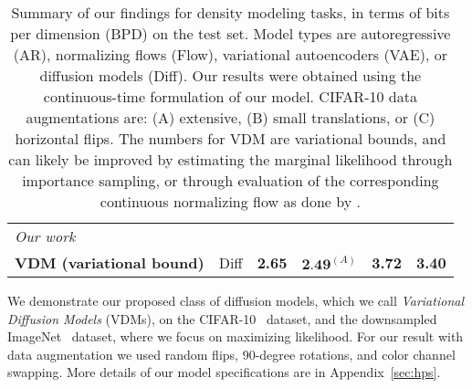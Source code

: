\documentclass{article}
\begin{document}
\begin{table}[t]
\begin{center}
\begin{tabular}{lccccc}
\midrule
\textit{Our work}\\
\textbf{VDM (variational bound)} & Diff & \textbf{2.65} & $\textbf{2.49}^{(A)}$ & \textbf{3.72} & \textbf{3.40} \\
\bottomrule
\end{tabular}
\end{center}
\caption{Summary of our findings for density modeling tasks, in terms of bits per dimension (BPD) on the test set. Model types are autoregressive (AR), normalizing flows (Flow), variational autoencoders (VAE), or diffusion models (Diff). Our results were obtained using the continuous-time formulation of our model. CIFAR-10 data augmentations are: (A) extensive, (B) small translations, or (C) horizontal flips. The numbers for VDM are variational bounds, and can likely be improved by estimating the marginal likelihood through importance sampling, or through evaluation of the corresponding continuous normalizing flow as done by \cite{song2021maximum}.}
\label{table:results}
\end{table}

We demonstrate our proposed class of diffusion models, which we call \emph{Variational Diffusion Models} (VDMs), on the CIFAR-10~\citep{krizhevsky2009learning} dataset, and the downsampled ImageNet~\citep{van2016pixel, deng2009imagenet} dataset, where we focus on maximizing likelihood. For our result with data augmentation we used random flips, 90-degree rotations, and color channel swapping. More details of our model specifications are in Appendix~\ref{sec:hps}.
\end{document}
